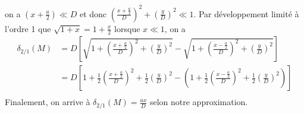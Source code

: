 \documentclass[a4paper,12pt]{book}
\begin{document}
on a $(x+\frac{a}{2}) \ll D$ et donc $\left(\frac{x+\frac{a}{2}}{D}\right)^2+(\frac{y}{D})^2 \ll 1$. Par développement limité à l'ordre 1 que 
$\sqrt{1+x} = 1+\frac{x}{2}$ lorsque $x\ll 1$, on a 
\begin{align*}
    \delta_{2/1}(M)&=D\left[\sqrt{1+\left(\frac{x+\frac{a}{2}}{D}\right)^2+(\frac{y}{D})^2}-\sqrt{1+\left(\frac{x-\frac{a}{2}}{D}\right)^2+(\frac{y}{D})^2}\right]\\
                   &=D\left[1+\frac{1}{2}\left(\frac{x+\frac{a}{2}}{D}\right)^2+\frac{1}{2}(\frac{y}{D})^2-\left(1+\frac{1}{2}\left(\frac{x-\frac{a}{2}}{D}\right)^2+\frac{1}{2}(\frac{y}{D})^2\right)\right]\\
\end{align*}
Finalement, on arrive à $\boxed{\delta_{2/1}(M)= \frac{ax}{D}}$ selon notre approximation. 
\end{document}
